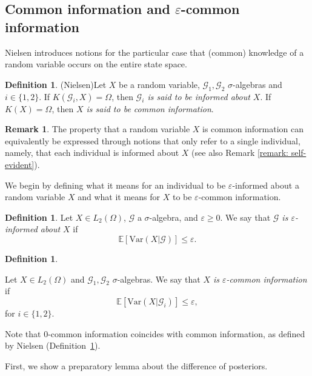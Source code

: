 \documentclass[a4paper, 10pt]{article}
\numberwithin{theorem}{section}
\theoremstyle{definition}
\newtheorem{definition}[theorem]{Definition}
\newtheorem{remark}[theorem]{Remark}
\newcommand{\E}{\mathbb{E}}
\newcommand{\G}{\mathcal{G}}
\newcommand{\Var}{\mathrm{Var}}
\renewcommand{\epsilon}{\varepsilon}
\begin{document}
\boldmath
\subsection{Common information and $\epsilon$-common information}
\unboldmath

Nielsen introduces notions for the particular case that (common) knowledge of a random variable occurs on the entire state space.

\begin{definition}{(Nielsen)}\label{def:informed}
	Let $X$ be a random variable, $\G_1, \G_2$ $\sigma$-algebras and $i \in \{1,2\}$. If  $K(\G_i,X)=\Omega$,  
    then \emph{$\G_i$ is said to be informed about $X$}.
	If $K(X)=\Omega$, 
    then \emph{$X$ is said to be common information}.
\end{definition}


\begin{remark}\label{remark:common_information}
The property that a random variable $X$ is common information can equivalently be expressed through notions that only refer to a single individual, namely, that each individual is informed about $X$ (see also Remark \ref{remark: self-evident}).
\end{remark}

We begin by defining what it means for an individual to be $\epsilon$-informed about a random variable $X$ and what it means for $X$ to be $\epsilon$-common information.

\begin{definition}\label{def:common_information}
	Let $X \in  L_2(\Omega)$, $\G$ a $\sigma$-algebra, and $\epsilon \geq 0$. We say that \emph{ $\G$ is $\epsilon$-informed about $X$} if
	$$ \E[\Var(X|\G)] \leq \epsilon .$$	
\end{definition}


\begin{definition}\label{def-X-CK}
	
	Let $X\in L_2(\Omega)$ and $\G_1, \G_2$ $\sigma$-algebras. We say that \emph{$X$ is $\epsilon$-common information} if 
	$$\E[\Var(X|\G_i)] \leq \epsilon, $$
	for $i \in \{1,2\}$.
\end{definition}


Note that $0$-common information coincides with common information, as defined by Nielsen (Definition~\ref{def:informed}).



First, we show a preparatory lemma about the difference of posteriors.
\end{document}
